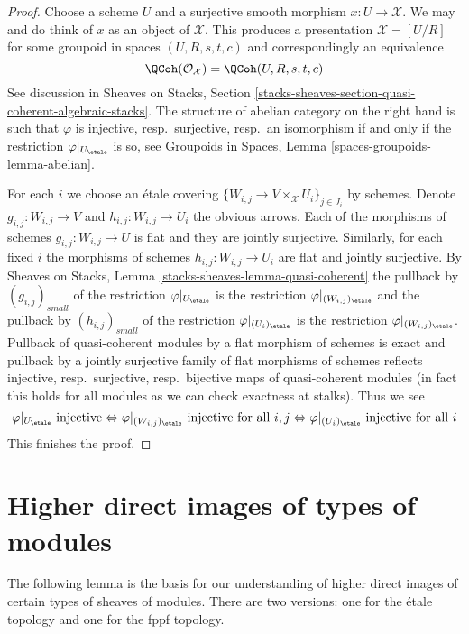 \begin{proof}
Choose a scheme $U$ and a surjective smooth morphism
$x : U \to \mathcal{X}$. We may and do think of $x$
as an object of $\mathcal{X}$.
This produces a presentation $\mathcal{X} = [U/R]$ for some groupoid
in spaces $(U, R, s, t, c)$ and correspondingly an equivalence
$$
\QCoh(\mathcal{O}_\mathcal{X}) = \QCoh(U, R, s, t, c)
$$
See discussion in Sheaves on Stacks, Section
\ref{stacks-sheaves-section-quasi-coherent-algebraic-stacks}.
The structure of abelian category on the right hand is such that $\varphi$
is injective, resp.\ surjective, resp.\ an isomorphism
if and only if the restriction $\varphi|_{U_\etale}$ is so, see
Groupoids in Spaces, Lemma \ref{spaces-groupoids-lemma-abelian}.

\medskip\noindent
For each $i$ we choose an \'etale covering
$\{W_{i, j} \to V \times_\mathcal{X} U_i\}_{j \in J_i}$
by schemes. Denote $g_{i, j} : W_{i, j} \to V$ and
$h_{i, j} : W_{i, j} \to U_i$ the obvious arrows.
Each of the morphisms of schemes $g_{i, j} : W_{i, j} \to U$ is flat
and they are jointly surjective.
Similarly, for each fixed $i$ the morphisms of schemes
$h_{i, j} : W_{i, j} \to U_i$ are flat and jointly surjective.
By Sheaves on Stacks, Lemma \ref{stacks-sheaves-lemma-quasi-coherent}
the pullback by $(g_{i, j})_{small}$ of the restriction
$\varphi|_{U_\etale}$ is the restriction $\varphi|_{(W_{i, j})_\etale}$
and the pullback by $(h_{i, j})_{small}$ of the restriction
$\varphi|_{(U_i)_\etale}$ is the restriction $\varphi|_{(W_{i, j})_\etale}$.
Pullback of quasi-coherent modules by a flat morphism of schemes is exact
and pullback by a jointly surjective family of flat morphisms of schemes
reflects injective, resp.\ surjective, resp.\ bijective maps
of quasi-coherent modules (in fact this holds for all modules
as we can check exactness at stalks). Thus we see
$$
\varphi|_{U_\etale} \text{ injective}
\Leftrightarrow
\varphi|_{(W_{i, j})_\etale} \text{ injective for all }i, j
\Leftrightarrow
\varphi|_{(U_i)_\etale} \text{ injective for all }i
$$
This finishes the proof.
\end{proof}




\section{Higher direct images of types of modules}
\label{section-key}

\noindent
The following lemma is the basis for our understanding of
higher direct images of certain types of sheaves of modules.
There are two versions: one for the \'etale topology and
one for the fppf topology.

